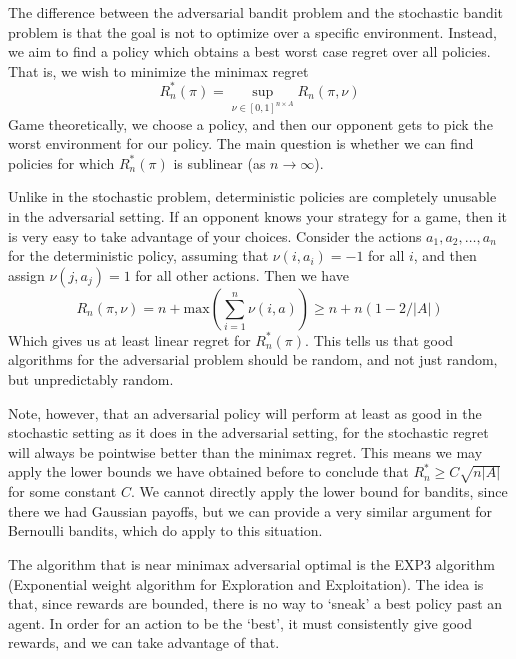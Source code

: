 The difference between the adversarial bandit problem and the stochastic bandit problem is that the goal is not to optimize over a specific environment. Instead, we aim to find a policy which obtains a best worst case regret over all policies. That is, we wish to minimize the minimax regret
%
\[ R_n^*(\pi) = \sup_{\nu \in [0,1]^{n \times A}} R_n(\pi, \nu) \]
%
Game theoretically, we choose a policy, and then our opponent gets to pick the worst environment for our policy. The main question is whether we can find policies for which $R_n^*(\pi)$ is sublinear (as $n \to \infty$).

Unlike in the stochastic problem, deterministic policies are completely unusable in the adversarial setting. If an opponent knows your strategy for a game, then it is very easy to take advantage of your choices. Consider the actions $a_1, a_2, \dots, a_n$ for the deterministic policy, assuming that $\nu(i,a_i) = -1$ for all $i$, and then assign $\nu(j,a_j) = 1$ for all other actions. Then we have
%
\[ R_n(\pi, \nu) = n + \text{max}\left(\sum_{i = 1}^n \nu(i,a) \right) \geq n + n \left( 1-2/|A| \right) \]
%
Which gives us at least linear regret for $R_n^*(\pi)$. This tells us that good algorithms for the adversarial problem should be random, and not just random, but unpredictably random.

Note, however, that an adversarial policy will perform at least as good in the stochastic setting as it does in the adversarial setting, for the stochastic regret will always be pointwise better than the minimax regret. This means we may apply the lower bounds we have obtained before to conclude that $R_n^* \geq C \sqrt{n |A|}$ for some constant $C$. We cannot directly apply the lower bound for bandits, since there we had Gaussian payoffs, but we can provide a very similar argument for Bernoulli bandits, which do apply to this situation.

The algorithm that is near minimax adversarial optimal is the EXP3 algorithm (Exponential weight algorithm for Exploration and Exploitation). The idea is that, since rewards are bounded, there is no way to `sneak' a best policy past an agent. In order for an action to be the `best', it must consistently give good rewards, and we can take advantage of that.

